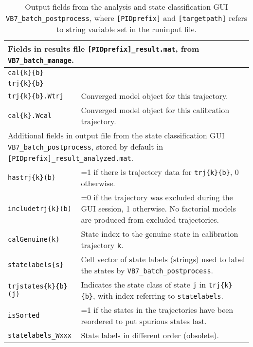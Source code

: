 \begin{table*}
\caption{Output fields from the analysis and state classification GUI 
\texttt{VB7\_batch\_postprocess}, where \texttt{[PIDprefix]} and \texttt{[targetpath]} refers to 
string variable set in the runinput file.}\label{tab:results}
\begin{center}
\begin{tabular}{|l|l|}
\hline
\multicolumn{2}{|l|}{
         \parbox[t]{1.5\columnwidth}{Fields in results
        file \texttt{[PIDprefix]\_result.mat},
        from \texttt{VB7\_batch\_manage}.}}
\\\hline
\texttt{cal\{k\}\{b\}}& \parboxc{}\\\hline
\texttt{trj\{k\}\{b\}}& \parboxc{}\\\hline
\texttt{trj\{k\}\{b\}.Wtrj}&Converged model object for this trajectory.\\\hline
\texttt{cal\{k\}.Wcal}&Converged model object for this calibration trajectory.\\\hline
\hline
\multicolumn{2}{|l|}{\parbox[t]{1.5\columnwidth}{
        Additional fields in output file from the state classification
        GUI \texttt{VB7\_batch\_postprocess}, stored by default
        in \texttt{[PIDprefix]\_result\_analyzed.mat}.}}
\\\hline
\texttt{hastrj\{k\}(b)}& =1 if there is trajectory data for \texttt{trj\{k\}\{b\}}, 0 otherwise.
\\\hline
\texttt{includetrj\{k\}(b)}& \parbox[t]{1.25\columnwidth}{
=0 if the trajectory was excluded during the GUI session, 1
otherwise. No factorial models are produced from excluded
trajectories.  }\\\hline
\texttt{calGenuine(k)}& 
State index to the genuine state in calibration trajectory \texttt{k}.
\\\hline
\texttt{statelabels\{s\}}& \parbox[t]{1.25\columnwidth}{
Cell vector of state labels (strings) used to label the states
by \texttt{VB7\_batch\_postprocess}.}
\\\hline
\texttt{trjstates\{k\}\{b\}(j)}& \parbox[t]{1.25\columnwidth}{
Indicates the state class of state \texttt{j}
in \texttt{trj\{k\}\{b\}}, with index referring
to \texttt{statelabels}.
}\\\hline
\texttt{isSorted}&\parbox[t]{1.25\columnwidth}{
=1 if the states in the trajectories have been reordered to put
spurious states last.}\\
\hline
\texttt{statelabels\_Wxxx}& \parbox[t]{1.25\columnwidth}{
State labels in different order (obsolete).}\\

\end{tabular}
\end{center}
\end{table*}
